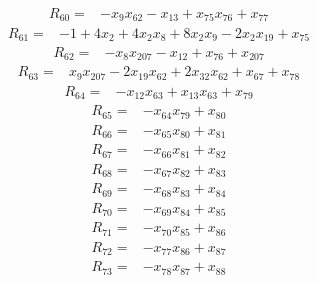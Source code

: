 {\begin{align*}
R_{60} ={}& -x_{9} x_{62} - x_{13} + x_{75} x_{76} + x_{77}
\end{align*}
\begin{align*}
R_{61} ={}& -1 + 4x_{2} + 4x_{2} x_{8} + 8x_{2} x_{9} - 2x_{2} x_{19} + x_{75}
\end{align*}
\begin{align*}
R_{62} ={}& -x_{8} x_{207} - x_{12} + x_{76} + x_{207}
\end{align*}
\begin{align*}
R_{63} ={}& x_{9} x_{207} - 2x_{19} x_{62} + 2x_{32} x_{62} + x_{67} + x_{78}
\end{align*}
\begin{align*}
R_{64} ={}& -x_{12} x_{63} + x_{13} x_{63} + x_{79}
\end{align*}
\begin{align*}
R_{65} ={}& -x_{64} x_{79} + x_{80}
\end{align*}
\begin{align*}
R_{66} ={}& -x_{65} x_{80} + x_{81}
\end{align*}
\begin{align*}
R_{67} ={}& -x_{66} x_{81} + x_{82}
\end{align*}
\begin{align*}
R_{68} ={}& -x_{67} x_{82} + x_{83}
\end{align*}
\begin{align*}
R_{69} ={}& -x_{68} x_{83} + x_{84}
\end{align*}
\begin{align*}
R_{70} ={}& -x_{69} x_{84} + x_{85}
\end{align*}
\begin{align*}
R_{71} ={}& -x_{70} x_{85} + x_{86}
\end{align*}
\begin{align*}
R_{72} ={}& -x_{77} x_{86} + x_{87}
\end{align*}
\begin{align*}
R_{73} ={}& -x_{78} x_{87} + x_{88}

\end{align*}}

